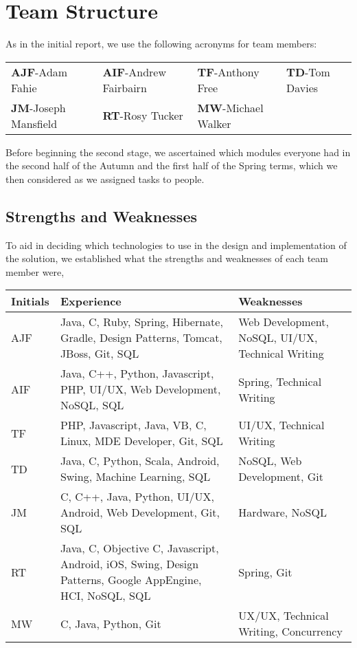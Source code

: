 \section{Team Structure}
\label{sec:team}

As in the initial report, we use the following acronyms for team members:

\begin{tabular}{ p{4cm} p{4cm} p{4cm} p{4cm} }
  \textbf{AJF}-Adam Fahie &
  \textbf{AIF}-Andrew Fairbairn &
  \textbf{TF}-Anthony Free &
  \textbf{TD}-Tom Davies \\
  \textbf{JM}-Joseph Mansfield &
  \textbf{RT}-Rosy Tucker &
  \textbf{MW}-Michael Walker & \\
\end{tabular}

Before beginning the second stage, we ascertained which modules everyone had in
the second half of the Autumn and the first half of the Spring terms, which we
then considered as we assigned tasks to people.

\subsection{Strengths and Weaknesses}
\label{sec:team-strengths}

To aid in deciding which technologies to use in the design and implementation
of the solution, we established what the strengths and weaknesses of each team
member were,

\begin{longtable}[H]{|p{2cm}|p{8cm}|p{5cm}|}
  \hline \cellcolor{titleColor}\textbf{Initials} &
  \cellcolor{titleColor}\textbf{Experience} &
  \cellcolor{titleColor}\textbf{Weaknesses}\\

  \hline AJF
  & Java, C, Ruby, Spring, Hibernate, Gradle, Design Patterns, Tomcat, JBoss,
  Git, SQL
  & Web Development, NoSQL, UI/UX, Technical Writing \\

  \hline AIF
  & Java, C++, Python, Javascript, PHP, UI/UX, Web Development, NoSQL, SQL
  & Spring, Technical Writing \\

  \hline TF
  & PHP, Javascript, Java, VB, C, Linux, MDE Developer, Git, SQL
  & UI/UX, Technical Writing \\

  \hline TD
  & Java, C, Python, Scala, Android, Swing, Machine Learning, SQL
  & NoSQL, Web Development, Git \\

  \hline JM
  & C, C++, Java, Python, UI/UX, Android, Web Development, Git, SQL
  & Hardware, NoSQL \\

  \hline RT
  & Java, C, Objective C, Javascript, Android, iOS, Swing, Design Patterns,
  Google AppEngine, HCI, NoSQL, SQL
  & Spring, Git \\

  \hline MW
  & C, Java, Python, Git
  & UX/UX, Technical Writing, Concurrency \\
  \hline
\end{longtable}

